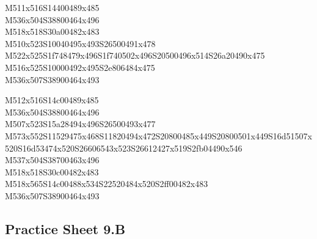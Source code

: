 \documentclass{article}
\begin{document}
\begin{multicols}{5}
\begin{center}
M511x516S14400489x485 %
\\M536x504S38800464x496 %
\\M518x518S30a00482x483 %
\\M510x523S10040495x493S26500491x478 %
\\M522x525S1f748479x496S1f740502x496S20500496x514S26a20490x475 %
\\M516x525S10000492x495S2e806484x475 %
\\M536x507S38900464x493 %
\vfil
\columnbreak

M512x516S14c00489x485 %
\\M536x504S38800464x496 %
\\M507x523S15a28494x496S26500493x477 %
\\M573x552S11529475x468S11820494x472S20800485x449S20800501x449S16d51507x520S16d53474x520S26606543x523S26612427x519S2fb04490x546 %
\\M537x504S38700463x496 %
\\M518x518S30c00482x483 %
\\M518x565S14c00488x534S22520484x520S2ff00482x483 %
\\M536x507S38900464x493 %
\vfil

\end{center}
\end{multicols}

\subsection{Practice Sheet 9.B}
\end{document}
